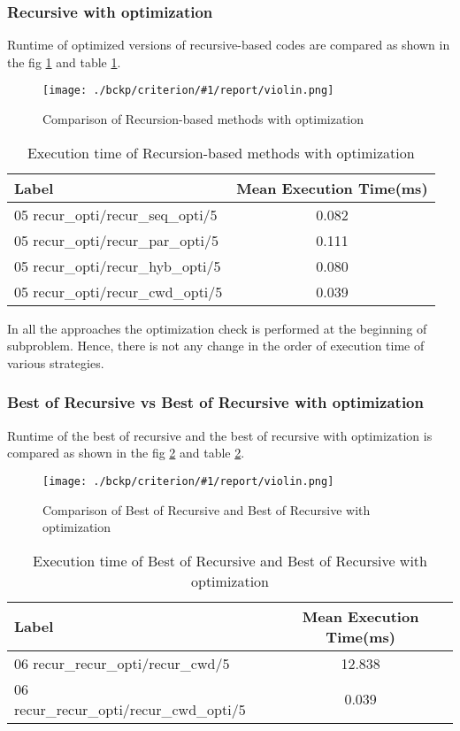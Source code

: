 \documentclass{article}
\newcommand{\loadGraph}[3]{{%
\begin{figure}[!ht]
    \texttt{[image: ./bckp/criterion/\#1/report/violin.png]}
    \caption{#3}
    \label{#2}
\end{figure}}
}%
\begin{document}
\subsubsection{Recursive with optimization}
Runtime of optimized versions of recursive-based codes are compared as shown in the fig \ref{05_recur_opti} and table \ref{recur_opti}.

\loadGraph{05 recur_opti}{05_recur_opti}{Comparison of Recursion-based methods with optimization}

\begin{table}[!ht]
\centering
\begin{tabular}{lc}    
\toprule
Label                                & Mean Execution Time(ms) \\ \midrule
05 recur\_opti/recur\_seq\_opti/5 & 0.082                   \\
05 recur\_opti/recur\_par\_opti/5 & 0.111                   \\
05 recur\_opti/recur\_hyb\_opti/5 & 0.080                   \\
05 recur\_opti/recur\_cwd\_opti/5 & 0.039                   \\ \bottomrule
\end{tabular}
\caption{Execution time of Recursion-based methods with optimization}
\label{recur_opti}
\end{table}

In all the approaches the optimization check is performed at the beginning of subproblem.
Hence, there is not any change in the order of execution time of various strategies.

\subsubsection{Best of Recursive vs Best of Recursive with optimization}
Runtime of the best of recursive and the best of recursive with optimization is compared as shown in the fig \ref{06_recur_recur_opti} and table \ref{recur_recur_opti}.

\loadGraph{06 recur_recur_opti}{06_recur_recur_opti}{Comparison of Best of Recursive and Best of Recursive with optimization}

\begin{table}[!ht]
\centering
\begin{tabular}{lc}    
\toprule
Label                                & Mean Execution Time(ms) \\ \midrule
06 recur\_recur\_opti/recur\_cwd/5       & 12.838                 \\
06 recur\_recur\_opti/recur\_cwd\_opti/5 & 0.039                  \\ \bottomrule
\end{tabular}
\caption{Execution time of Best of Recursive and Best of Recursive with optimization}
\label{recur_recur_opti}
\end{table}
\end{document}
